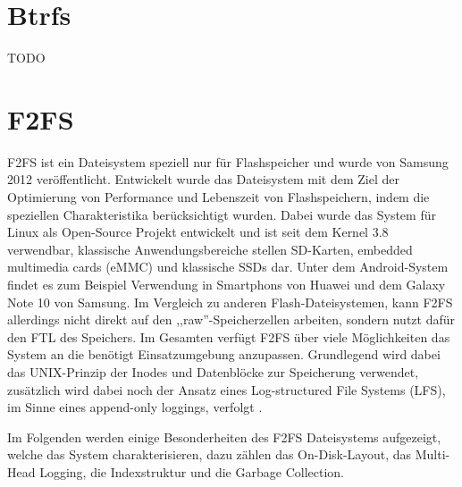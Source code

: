 \documentclass[11pt]{article}
\begin{document}
\section{Btrfs}
\label{Btrfs}

TODO


\newpage
\section{F2FS}
\label{F2FS}
F2FS ist ein Dateisystem speziell nur für Flashspeicher und wurde von Samsung 2012 veröffentlicht. Entwickelt wurde das Dateisystem mit dem Ziel der Optimierung von Performance und Lebenszeit von Flashspeichern, indem die speziellen Charakteristika berücksichtigt wurden. Dabei wurde das System für Linux als Open-Source Projekt entwickelt und ist seit dem Kernel 3.8 verwendbar, klassische Anwendungsbereiche stellen SD-Karten, embedded multimedia cards (eMMC) und klassische SSDs dar. Unter dem Android-System findet es zum Beispiel Verwendung in Smartphons von Huawei und dem Galaxy Note 10 von Samsung. Im Vergleich zu anderen Flash-Dateisystemen, kann F2FS allerdings nicht direkt auf den ,,raw''-Speicherzellen arbeiten, sondern nutzt dafür den FTL des Speichers. Im Gesamten verfügt F2FS über viele Möglichkeiten das System an die benötigt Einsatzumgebung anzupassen. Grundlegend wird dabei das UNIX-Prinzip der Inodes und Datenblöcke zur Speicherung verwendet, zusätzlich wird dabei noch der Ansatz eines Log-structured File Systems (LFS), im Sinne eines append-only loggings, verfolgt \cite{lee2015f2fs}.

Im Folgenden werden einige Besonderheiten des F2FS Dateisystems aufgezeigt, welche das System charakterisieren, dazu zählen das On-Disk-Layout, das Multi-Head Logging, die Indexstruktur und die Garbage Collection.
\end{document}
